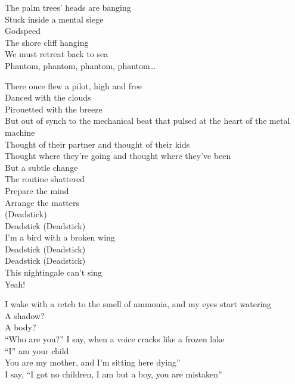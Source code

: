 The palm trees' heads are banging \\
Stuck inside a mental siege \\
Godspeed \\
The shore cliff hanging \\
We must retreat back to sea \\

Phantom, phantom, phantom, phantom… \\




There once flew a pilot, high and free \\
Danced with the clouds \\
Pirouetted with the breeze \\
But out of synch to the mechanical beat that pulsed at the heart of the metal machine \\
Thought of their partner and thought of their kids \\
Thought where they're going and thought where they've been \\
But a subtle change \\
The routine shattered \\
Prepare the mind \\
Arrange the matters \\

 (Deadstick) \\
Deadstick (Deadstick) \\
I'm a bird with a broken wing \\
Deadstick (Deadstick) \\
Deadstick (Deadstick) \\
This nightingale can't sing \\
Yeah! \\


I wake with a retch to the smell of ammonia, and my eyes start watering \\
A shadow? \\
A body? \\
``Who are you?'' I say, when a voice cracks like a frozen lake \\
``I'' am your child \\
You are my mother, and I'm sitting here dying'' \\
I say, ``I got no children, I am but a boy, you are mistaken'' \\

